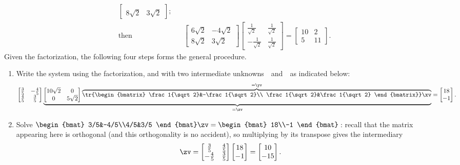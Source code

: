 \begin{example}
\begin{solution}
\begin{eqnarray*}
\begin{bmatrix}
\\ 8{\sqrt2}&3{\sqrt2} \end{bmatrix};
\\\text{then}&&
\begin{bmatrix} 6{\sqrt2}& -4{\sqrt2}
\\ 8{\sqrt2}&3{\sqrt2} \end{bmatrix}
\begin{bmatrix} \frac1{\sqrt2}&\frac1{\sqrt2}\\ -\frac1{\sqrt2}&\frac1{\sqrt2} \end{bmatrix}
=\begin{bmatrix} 10&2\\5&11 \end{bmatrix}.
\end{eqnarray*}
Given the factorization, the following four steps forms the general procedure. 
\begin{enumerate}
\item Write the system using the factorization, and with two intermediate unknowns~\yv\ and~\zv\ as indicated below:
\begin{equation*}
\begin{bmatrix} \frac35&-\frac45\\\frac45&\frac35 \end{bmatrix}
\underbrace{\begin{bmatrix} 10\sqrt2&0\\0&5\sqrt2 \end{bmatrix}
\overbrace{\tr{\begin{bmatrix} \frac1{\sqrt2}&-\frac1{\sqrt2}\\ \frac1{\sqrt2}&\frac1{\sqrt2} \end{bmatrix}}\xv}^{=\yv}}_{=\zv}=\begin{bmatrix} 18\\-1 \end{bmatrix}.
\end{equation*}

\item Solve \(\begin{bmat} 3/5&-4/5\\4/5&3/5 \end{bmat}\zv=\begin{bmat} 18\\-1 \end{bmat}\)\,: recall that the matrix appearing here is orthogonal (and this orthogonality is no accident), so multiplying by its transpose gives the intermediary
\begin{equation*}
\zv=\begin{bmatrix} \frac35&\frac45\\-\frac45&\frac35 \end{bmatrix}
\begin{bmatrix} 18\\-1 \end{bmatrix}
=\begin{bmatrix} 10\\-15 \end{bmatrix}.
\end{equation*}


\end{enumerate}
\end{solution}
\end{example}
